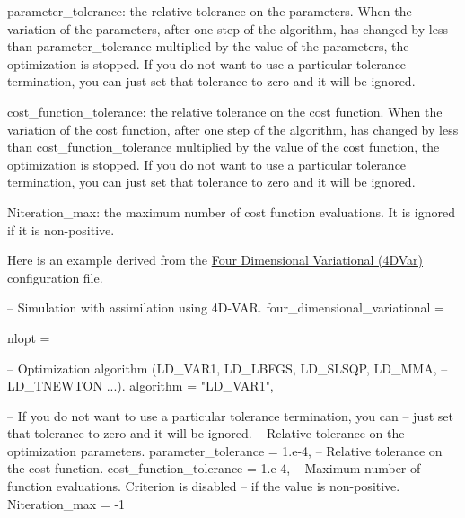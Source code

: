 \documentclass{tufte-book}
\begin{document}
\begin{DoxyItemize}
\item {\ttfamily parameter\-\_\-tolerance}\-: the relative tolerance on the parameters. \-When the variation of the parameters, after one step of the algorithm, has changed by less than {\ttfamily parameter\-\_\-tolerance} multiplied by the value of the parameters, the optimization is stopped. \-If you do not want to use a particular tolerance termination, you can just set that tolerance to zero and it will be ignored.


\item {\ttfamily cost\-\_\-function\-\_\-tolerance}\-: the relative tolerance on the cost function. \-When the variation of the cost function, after one step of the algorithm, has changed by less than {\ttfamily cost\-\_\-function\-\_\-tolerance} multiplied by the value of the cost function, the optimization is stopped. \-If you do not want to use a particular tolerance termination, you can just set that tolerance to zero and it will be ignored.


\item {\ttfamily \-Niteration\-\_\-max}\-: the maximum number of cost function evaluations. \-It is ignored if it is non-\/positive.


\end{DoxyItemize}

\-Here is an example derived from the \hyperlink{four_dimensional_variational}{\-Four \-Dimensional \-Variational (4\-D\-Var)} configuration file.

 \begin{frame_lua}
-- Simulation with assimilation using 4D-VAR.
four_dimensional_variational = {

   nlopt = {

      -- Optimization algorithm (LD_VAR1, LD_LBFGS, LD_SLSQP, LD_MMA,
      -- LD_TNEWTON ...).
      algorithm = "LD_VAR1",

      -- If you do not want to use a particular tolerance termination, you can
      -- just set that tolerance to zero and it will be ignored.
      -- Relative tolerance on the optimization parameters.
      parameter_tolerance = 1.e-4,
      -- Relative tolerance on the cost function.
      cost_function_tolerance = 1.e-4,
      -- Maximum number of function evaluations. Criterion is disabled
      -- if the value is non-positive.
      Niteration_max = -1

   }

}
\end{frame_lua}
\end{document}
